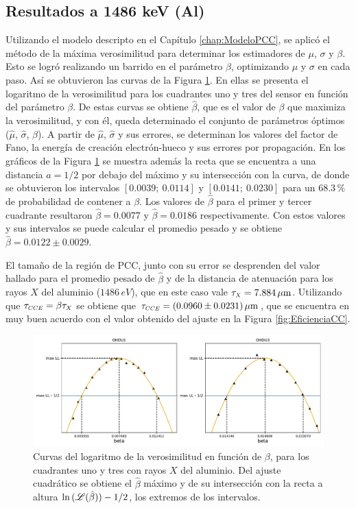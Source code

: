 \subsection{Resultados a 1486 keV (Al)}
\noindent Utilizando el modelo descripto en el Capítulo \ref{chap:ModeloPCC}, se aplicó el método de la máxima verosimilitud para determinar los estimadores de $\mu$, $\sigma$ y $\beta$. Esto se logró realizando un barrido en el parámetro $\beta$, optimizando $\mu$ y $\sigma$ en cada paso. Así se obtuvieron las curvas de la Figura \ref{fig:Al_barridos_beta}. En ellas se presenta el logaritmo de la verosimilitud para los cuadrantes uno y tres del sensor en función del parámetro $\beta$. De estas curvas se obtiene $\hat{\beta}$, que es el valor de $\beta$ que maximiza la verosimilitud, y con él, queda determinado el conjunto de parámetros óptimos ($\hat{\mu}$, $\hat{\sigma}$, $\hat{\beta}$). A partir de $\hat{\mu}$, $\hat{\sigma}$ y sus errores, se determinan los valores del factor de Fano, la energía de creación electrón-hueco y sus errores por propagación. En los gráficos de la Figura \ref{fig:Al_barridos_beta} se muestra además la recta que se encuentra a una distancia $a=1/2$ por debajo del máximo y su intersección con la curva, de donde se obtuvieron los intervalos $[0.0039;\ 0.0114]$ y $[0.0141;\ 0.0230]$ para un $68.3\,\%$ de probabilidad de contener a $\beta$. Los valores de $\hat{\beta}$ para el primer y tercer cuadrante resultaron $\hat{\beta} = 0.0077$ y $\hat{\beta}=0.0186$ respectivamente. Con estos valores y sus intervalos se puede calcular el promedio pesado y se obtiene $\hat{\beta} = 0.0122 \pm 0.0029 $.

El tamaño de la región de PCC, junto con su error se desprenden del valor hallado para el promedio pesado de $\hat{\beta}$ y de la distancia de atenuación para los rayos $X$ del aluminio ($1486\,\si{eV}$), que en este caso vale $\tau_{\scaleto{X}{4pt}}=7.884\,\si{\mu m}$\cite{AttenuationLength}. Utilizando que $\tau_{\scaleto{CCE}{4pt}} = \beta \tau_{\scaleto{X}{4pt}}$ se obtiene que $\tau_{\scaleto{CCE}{4pt}}=(0.0960\pm0.0231)\,\si{\mu m} $, que se encuentra en muy buen acuerdo con el valor obtenido del ajuste en la Figura \ref{fig:EficienciaCC}\cite{PCC-CCE-interno}.
\begin{figure}[h]
    \centering
        \includegraphics[scale=0.5]{Figs/Al_barridos_beta.pdf}
    \caption{Curvas del logaritmo de la verosimilitud en función de $\beta$, para los cuadrantes uno y tres con rayos $X$ del aluminio. Del ajuste cuadrático se obtiene el $\hat{\beta}$ máximo y de su intersección con la recta a altura $\ln{(\mathscr{L}(\hat{\beta}))} - 1/2$, los extremos de los intervalos.}
    \label{fig:Al_barridos_beta}
\end{figure}

